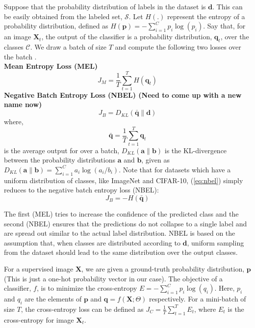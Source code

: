Suppose that the probability distribution of labels in the dataset is $\mathbf{d}$. This can be
easily obtained from the labeled set, $\mathcal{S}$.  Let $H(.)$ represent the entropy of a
probability distribution, defined as $H(\mathbf{p}) = -\sum_{i=1}^{C}p_i \log(p_i)$.  Say that, for
an image $\mathbf{X}_t$, the output of the classifier is a probability distribution, $\mathbf{q}_t$,
over the classes $\mathcal{C}$. We draw a batch of size $T$ and compute the following two losses
over the batch \cite{subic}.\\
\newline
\textbf{Mean Entropy Loss (MEL)}
\begin{equation}
	J_M = \frac{1}{T}\sum_{t=1}^{T}H(\mathbf{q}_t)
\end{equation}
\textbf{Negative Batch Entropy Loss (NBEL) (Need to come up with a new name now)}
\begin{equation}
	\label{eq:nbel}
	J_B = D_{KL} (\bar{\mathbf{q}} \lVert \mathbf{d})
\end{equation}
where,
\begin{equation}
	\label{eq:avg_out}
	\bar{\mathbf{q}} = \frac{1}{T}\sum_{t=1}^{T}\mathbf{q}_t
\end{equation}
is the average output for over a batch, $D_{KL}(\mathbf{a} \lVert \mathbf{b})$ is the KL-divergence
between the probability distributions $\mathbf{a}$ and $\mathbf{b}$, given as $D_{KL}(\mathbf{a}
\lVert \mathbf{b}) = \sum_{i=1}^{C}a_i \log(a_i / b_i)$. Note that for datasets which have a uniform
distribution of classes, like ImageNet and CIFAR-10, (\ref{eq:nbel}) simply reduces to the negative
batch entropy loss (NBEL):
\begin{equation}
	J_B = -H(\bar{\mathbf{q}})
\end{equation}

The first (MEL) tries to increase the confidence of the predicted class and the second (NBEL)
ensures that the predictions do not collapse to a single label and are spread out similar to
the actual label distribution. NBEL is based on the assumption that, when classes are distributed
according to $\mathbf{d}$, uniform sampling from the dataset should lead to the same distribution
over the output classes.

For a supervised image $\mathbf X$, we are given a ground-truth probability distribution, $\mathbf{p}$ (This is
just a one-hot probability vector in our case). The objective of a classifier, $f$, is to minimize the
cross-entropy $E = -\sum_{i=1}^{C}p_i \log(q_i)$. Here, $p_i$ and $q_i$
are the elements of $\mathbf{p}$ and $\mathbf{q} = f(\mathbf{X}; \Theta)$ respectively. For a
mini-batch of size $T$, the cross-entropy loss can be defined as $J_C = \frac{1}{T} \sum_{t=1}^{T}
E_t$, where $E_t$ is the cross-entropy for image $\mathbf{X}_t$.

